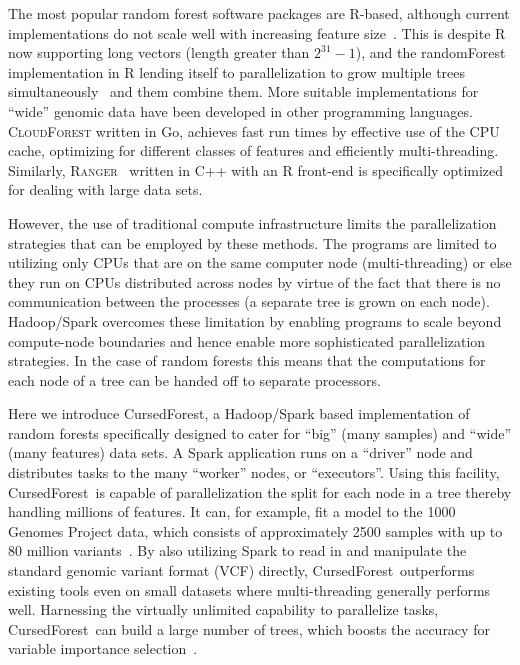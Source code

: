 \documentclass[10pt,letterpaper]{article}
\newcommand{\cursedforest}{{\sc CursedForest}}
\begin{document}
The most popular random forest software packages are R-based, although current implementations do not scale well with
increasing feature size~\cite{Wright.and.Ziegle.2016}.  This is despite R now supporting long vectors (length greater
than $2^{31}-1$), and the {\sc randomForest} implementation in R lending itself to parallelization to grow multiple
trees simultaneously~\cite{Liaw.and.Weiner.2002} and them combine them.  More suitable implementations for ``wide''
genomic data have been developed in other programming languages. \textsc{CloudForest} \cite{Bressler2015} written in Go,
achieves fast run times by effective use of the CPU cache, optimizing for different classes of features and efficiently
multi-threading.  Similarly, \textsc{Ranger}~\cite{Wright.and.Ziegle.2016} written in C++ with an R front-end is
specifically optimized for dealing with large data sets.

However, the use of traditional compute infrastructure limits the parallelization strategies that can be employed by  
these methods.  The programs are limited to utilizing only CPUs that are on the same computer node (multi-threading) or
else they run on CPUs distributed across nodes by virtue of the fact that there is no communication between the
processes (a separate tree is grown on each node).  Hadoop/Spark overcomes these limitation by enabling programs to
scale beyond compute-node boundaries and hence enable more sophisticated parallelization strategies.  In the case of
random forests this means that the computations for each node of a tree can be handed off to separate processors.
  
Here we introduce \cursedforest, a Hadoop/Spark based implementation of random forests specifically designed to cater
for ``big'' (many samples) and ``wide'' (many features) data sets. A Spark application runs on a ``driver'' node and
distributes tasks to the many ``worker'' nodes, or ``executors''. Using this facility, \cursedforest\ is capable of
parallelization the split for each node in a tree thereby handling millions of features. It can, for example, fit a
model to the 1000 Genomes Project data, which consists of approximately 2500 samples with up to 80 million
variants~\cite{1KG2012}.  By also utilizing Spark to read in and manipulate the standard genomic variant format (VCF)
directly, \cursedforest\ outperforms existing tools even on small datasets where multi-threading generally performs
well. Harnessing the virtually unlimited capability to parallelize tasks, \cursedforest\ can build a large number of
trees, which boosts the accuracy for variable importance selection~\cite{Szymczak2016}.
\end{document}
